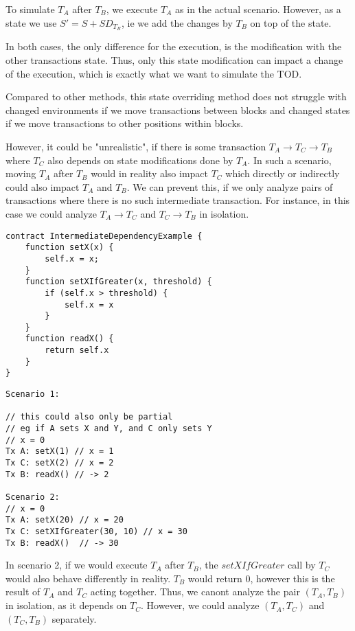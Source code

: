 \documentclass[draft,final]{vutinfth} %
\begin{document}
To simulate $T_A$ after $T_B$, we execute $T_A$ as in the actual scenario. However, as a state we use $S\prime = S + SD_{T_B}$, ie we add the changes by $T_B$ on top of the state.

In both cases, the only difference for the execution, is the modification with the other transactions state. Thus, only this state modification can impact a change of the execution, which is exactly what we want to simulate the TOD.

Compared to other methods, this state overriding method does not struggle with changed environments if we move transactions between blocks and changed states if we move transactions to other positions within blocks.

However, it could be "unrealistic", if there is some transaction $T_A \rightarrow T_C \rightarrow T_B$ where $T_C$ also depends on state modifications done by $T_A$. In such a scenario, moving $T_A$ after $T_B$ would in reality also impact $T_C$ which directly or indirectly could also impact $T_A$ and $T_B$. We can prevent this, if we only analyze pairs of transactions where there is no such intermediate transaction. For instance, in this case we could analyze $T_A \rightarrow T_C$ and $T_C \rightarrow T_B$ in isolation.

\begin{verbatim}
contract IntermediateDependencyExample {
    function setX(x) {
        self.x = x;
    }
    function setXIfGreater(x, threshold) {
        if (self.x > threshold) {
            self.x = x
        }
    }
    function readX() {
        return self.x
    }
}
\end{verbatim}

\begin{verbatim}
Scenario 1:

// this could also only be partial
// eg if A sets X and Y, and C only sets Y
// x = 0
Tx A: setX(1) // x = 1
Tx C: setX(2) // x = 2
Tx B: readX() // -> 2

Scenario 2:
// x = 0
Tx A: setX(20) // x = 20
Tx C: setXIfGreater(30, 10) // x = 30
Tx B: readX()  // -> 30
\end{verbatim}

In scenario 2, if we would execute $T_A$ after $T_B$, the $setXIfGreater$ call by $T_C$ would also behave differently in reality. $T_B$ would return $0$, however this is the result of $T_A$ and $T_C$ acting together. Thus, we canont analyze the pair $(T_A, T_B)$ in isolation, as it depends on $T_C$. However, we could analyze $(T_A, T_C)$ and $(T_C, T_B)$ separately.
\end{document}
